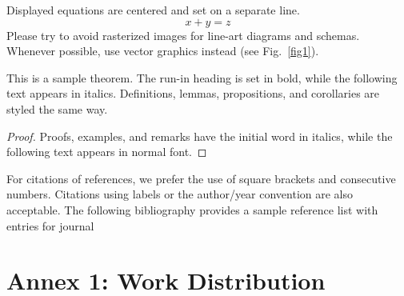 \documentclass[runningheads]{llncs}
\begin{document}
\noindent Displayed equations are centered and set on a separate
line.
\begin{equation}
x + y = z
\end{equation}
Please try to avoid rasterized images for line-art diagrams and
schemas. Whenever possible, use vector graphics instead (see
Fig.~\ref{fig1}).

\begin{theorem}
This is a sample theorem. The run-in heading is set in bold, while
the following text appears in italics. Definitions, lemmas,
propositions, and corollaries are styled the same way.
\end{theorem}
%
%
\begin{proof}
Proofs, examples, and remarks have the initial word in italics,
while the following text appears in normal font.
\end{proof}
For citations of references, we prefer the use of square brackets
and consecutive numbers. Citations using labels or the author/year
convention are also acceptable. The following bibliography provides
a sample reference list with entries for journal
\cite{BFS}
%
%
%
% 
% 
%

 
 
\appendix
\chapter*{Annex 1: Work Distribution }
\end{document}
